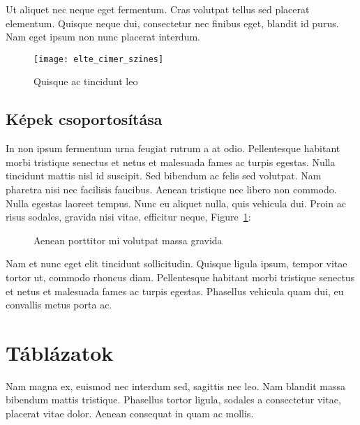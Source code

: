Ut aliquet nec neque eget fermentum. Cras volutpat tellus sed placerat elementum. Quisque neque dui, consectetur nec finibus eget, blandit id purus. Nam eget ipsum non nunc placerat interdum.

\begin{figure}[H]
	\centering
	\texttt{[image: elte\_cimer\_szines]}
	\caption{Quisque ac tincidunt leo}
\end{figure}

\subsection{Képek csoportosítása} %

In non ipsum fermentum urna feugiat rutrum a at odio. Pellentesque habitant morbi tristique senectus et netus et malesuada fames ac turpis egestas. Nulla tincidunt mattis nisl id suscipit. Sed bibendum ac felis sed volutpat. Nam pharetra nisi nec facilisis faucibus. Aenean tristique nec libero non commodo. Nulla egestas laoreet tempus. Nunc eu aliquet nulla, quis vehicula dui. Proin ac risus sodales, gravida nisi vitae, efficitur neque, Figure~\ref{fig:example-2}:

\begin{figure}[H]
	\centering
	\hspace{5pt}
	\caption{Aenean porttitor mi volutpat massa gravida}
	\label{fig:example-2}
\end{figure}

Nam et nunc eget elit tincidunt sollicitudin. Quisque ligula ipsum, tempor vitae tortor ut, commodo rhoncus diam. Pellentesque habitant morbi tristique senectus et netus et malesuada fames ac turpis egestas. Phasellus vehicula quam dui, eu convallis metus porta ac.


\section{Táblázatok} %

Nam magna ex, euismod nec interdum sed, sagittis nec leo. Nam blandit massa bibendum mattis tristique. Phasellus tortor ligula, sodales a consectetur vitae, placerat vitae dolor. Aenean consequat in quam ac mollis. 

